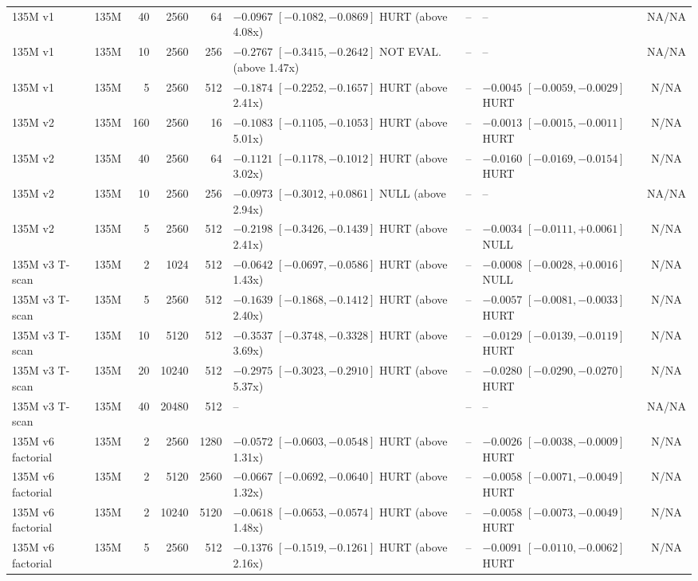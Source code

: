 \begin{landscape}
\begin{ThreePartTable}
\begin{longtable}{@{}p{3.2cm}lrrr p{5.3cm} p{2.0cm} p{5.0cm} c@{}}
135M v1 & 135M & 40 & 2560 & 64 & $-0.0967$ $[-0.1082,-0.0869]$ HURT (above 4.08x) & -- & -- & NA/NA \\
135M v1 & 135M & 10 & 2560 & 256 & $-0.2767$ $[-0.3415,-0.2642]$ NOT EVAL. (above 1.47x) & -- & -- & NA/NA \\
135M v1 & 135M & 5 & 2560 & 512 & $-0.1874$ $[-0.2252,-0.1657]$ HURT (above 2.41x) & -- & $-0.0045$ $[-0.0059,-0.0029]$ HURT & N/NA \\
135M v2 & 135M & 160 & 2560 & 16 & $-0.1083$ $[-0.1105,-0.1053]$ HURT (above 5.01x) & -- & $-0.0013$ $[-0.0015,-0.0011]$ HURT & N/NA \\
135M v2 & 135M & 40 & 2560 & 64 & $-0.1121$ $[-0.1178,-0.1012]$ HURT (above 3.02x) & -- & $-0.0160$ $[-0.0169,-0.0154]$ HURT & N/NA \\
135M v2 & 135M & 10 & 2560 & 256 & $-0.0973$ $[-0.3012,+0.0861]$ NULL (above 2.94x) & -- & -- & NA/NA \\
135M v2 & 135M & 5 & 2560 & 512 & $-0.2198$ $[-0.3426,-0.1439]$ HURT (above 2.41x) & -- & $-0.0034$ $[-0.0111,+0.0061]$ NULL & N/NA \\
135M v3 T-scan & 135M & 2 & 1024 & 512 & $-0.0642$ $[-0.0697,-0.0586]$ HURT (above 1.43x) & -- & $-0.0008$ $[-0.0028,+0.0016]$ NULL & N/NA \\
135M v3 T-scan & 135M & 5 & 2560 & 512 & $-0.1639$ $[-0.1868,-0.1412]$ HURT (above 2.40x) & -- & $-0.0057$ $[-0.0081,-0.0033]$ HURT & N/NA \\
135M v3 T-scan & 135M & 10 & 5120 & 512 & $-0.3537$ $[-0.3748,-0.3328]$ HURT (above 3.69x) & -- & $-0.0129$ $[-0.0139,-0.0119]$ HURT & N/NA \\
135M v3 T-scan & 135M & 20 & 10240 & 512 & $-0.2975$ $[-0.3023,-0.2910]$ HURT (above 5.37x) & -- & $-0.0280$ $[-0.0290,-0.0270]$ HURT & N/NA \\
135M v3 T-scan & 135M & 40 & 20480 & 512 & -- & -- & -- & NA/NA \\
135M v6 factorial & 135M & 2 & 2560 & 1280 & $-0.0572$ $[-0.0603,-0.0548]$ HURT (above 1.31x) & -- & $-0.0026$ $[-0.0038,-0.0009]$ HURT & N/NA \\
135M v6 factorial & 135M & 2 & 5120 & 2560 & $-0.0667$ $[-0.0692,-0.0640]$ HURT (above 1.32x) & -- & $-0.0058$ $[-0.0071,-0.0049]$ HURT & N/NA \\
135M v6 factorial & 135M & 2 & 10240 & 5120 & $-0.0618$ $[-0.0653,-0.0574]$ HURT (above 1.48x) & -- & $-0.0058$ $[-0.0073,-0.0049]$ HURT & N/NA \\
135M v6 factorial & 135M & 5 & 2560 & 512 & $-0.1376$ $[-0.1519,-0.1261]$ HURT (above 2.16x) & -- & $-0.0091$ $[-0.0110,-0.0062]$ HURT & N/NA \\

\end{longtable}
\end{ThreePartTable}
\end{landscape}
